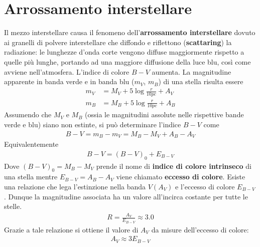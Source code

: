 \documentclass[a4paper, oneside]{book}
\begin{document}
\section{Arrossamento interstellare}
Il mezzo interstellare causa il fenomeno dell'\textbf{arrossamento interstellare} dovuto
ai granelli di polvere interstellare che diffondo e riflettono (\textbf{scattaring}) la radiazione: le lunghezze
d'onda corte vengono diffuse maggiormente rispetto a quelle più lunghe, portando ad una 
maggiore diffusione della luce blu, così come avviene nell'atmosfera.
L'indice di colore $B-V$ aumenta. La magnitudine apparente in banda verde e in banda blu ($m_V$, $m_B$) di una stella risulta essere
\begin{align*}
    m_V &= M_V + 5\log \frac{r}{10 pc} + A_V \\
    m_B &= M_B + 5 \log \frac{r}{10 pc} + A_B
\end{align*} 
Assumendo che $M_V$ e $M_B$ (ossia le magnitudini assolute nelle rispettive
bande verde e blu) siano non estinte, si può determinare l'indice $B-V$ come
\begin{gather*}
    B - V = m_B - m_V = M_B - M_V + A_B - A_V 
\end{gather*}
Equivalentemente
\begin{align}
    B - V = (B - V)_0 + E_{B - V}
\end{align}
Dove $(B- V)_0= M_B - M_V$ prende il nome di \textbf{indice di colore intrinseco}
di una stella mentre $E_{B - V} = A_B - A_V$ viene chiamato \textbf{eccesso di colore}.
Esiste una relazione che lega l'estinzione nella banda $V(A_V)$ e l'eccesso di colore $E_{B - V}$. Dunque 
la magnitudine associata ha un valore all'incirca costante per tutte le stelle.  
\begin{align}
    R = \frac{A_V}{E_{B - V}} \approx 3.0
\end{align}
Grazie a tale relazione si ottiene il valore di $A_V$ da misure dell'eccesso di colore:
\begin{align}
    A_V \approx 3 E_{B - V}
\end{align}

\clearpage
\end{document}
